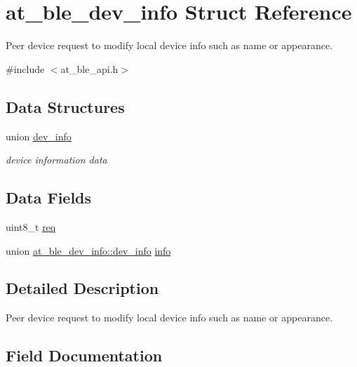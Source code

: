 \hypertarget{structat__ble__dev__info}{}\section{at\+\_\+ble\+\_\+dev\+\_\+info Struct Reference}
\label{structat__ble__dev__info}


Peer device request to modify local device info such as name or appearance.  




{\ttfamily \#include $<$at\+\_\+ble\+\_\+api.\+h$>$}

\subsection*{Data Structures}
\begin{DoxyCompactItemize}
\item 
union \mbox{\hyperlink{unionat__ble__dev__info_1_1dev__info}{dev\+\_\+info}}
\begin{DoxyCompactList}\small\item\em device information data \end{DoxyCompactList}\end{DoxyCompactItemize}
\subsection*{Data Fields}
\begin{DoxyCompactItemize}
\item 
uint8\+\_\+t \mbox{\hyperlink{structat__ble__dev__info_aee31b0c3b9c08cd76406c7bd7cf74642}{req}}
\item 
union \mbox{\hyperlink{unionat__ble__dev__info_1_1dev__info}{at\+\_\+ble\+\_\+dev\+\_\+info\+::dev\+\_\+info}} \mbox{\hyperlink{structat__ble__dev__info_aeec55f1751a505d6d38363cf24369c7d}{info}}
\end{DoxyCompactItemize}


\subsection{Detailed Description}
Peer device request to modify local device info such as name or appearance. 

\subsection{Field Documentation}
\mbox{\label{structat__ble__dev__info_aeec55f1751a505d6d38363cf24369c7d}} 
